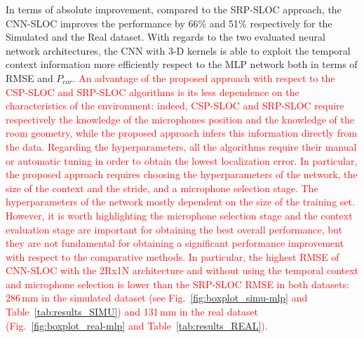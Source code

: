 \documentclass[review]{elsarticle}
\newcommand{\figref}[1]{Fig.~\ref{#1}}
\newcommand{\tableref}[1]{Table~\ref{#1}}
\begin{document}
In terms of absolute improvement, compared to the SRP-SLOC approach, the CNN-SLOC improves the performance by 66\% and 51\% respectively for the Simulated and the Real dataset. With regards to the two evaluated neural network architectures, the CNN with 3-D kernels is able to exploit the temporal context information more efficiently respect to the MLP network both in terms of RMSE and $P_{cor}$.
\textcolor{red}{An advantage of the proposed approach with respect to the CSP-SLOC and SRP-SLOC algorithms is its less dependence on the characteristics of the environment: indeed, CSP-SLOC and SRP-SLOC require respectively the knowledge of the microphones position and the knowledge of the room geometry, while the proposed approach infers this information directly from the data. Regarding the hyperparameters, all the algorithms require their manual or automatic tuning in order to obtain the lowest localization error. In particular, the proposed approach requires choosing the hyperparameters of the network, the size of the context and the stride, and a microphone selection stage. The hyperparameters of the network mostly dependent on the size of the training set. However, it is worth highlighting the microphone selection stage and the context evaluation stage are important for obtaining the best overall performance, but they are not fundamental for obtaining a significant performance improvement with respect to the comparative methods. In particular, the highest RMSE of CNN-SLOC with the 2Rx1N architecture and without using the temporal context and microphone selection is lower than the SRP-SLOC RMSE in both datasets: 286\,mm in the simulated dataset (see \figref{fig:boxplot_simu-mlp} and \tableref{tab:results_SIMU}) and 131\,mm in the real dataset (\figref{fig:boxplot_real-mlp} and \tableref{tab:results_REAL}).}

\end{document}
